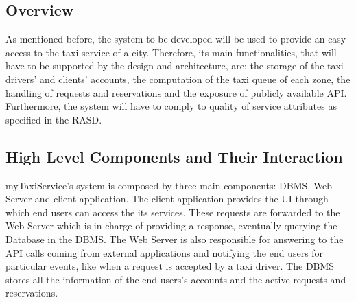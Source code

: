 \documentclass{article}
\begin{document}
	\subsection{Overview}
	As mentioned before, the system to be developed will be used to provide an easy access to the taxi service of a city. Therefore, its main functionalities, that will have to be supported by the design and architecture, are: the storage of the taxi drivers' and clients' accounts, the computation of the taxi queue of each zone, the handling of requests and reservations and the exposure of publicly available API\@. Furthermore, the system will have to comply to quality of service attributes as specified in the RASD\@.
	\subsection{High Level Components and Their Interaction}
	myTaxiService's system is composed by three main components: DBMS, Web Server and client application. The client application provides the UI through which end users can access the its services. These requests are forwarded to the Web Server which is in charge of providing a response, eventually querying the Database in the DBMS. The Web Server is also responsible for answering to the API calls coming from external applications and notifying the end users for particular events, like when a request is accepted by a taxi driver. The DBMS stores all the information of the end users's accounts and the active requests and reservations.
\end{document}
